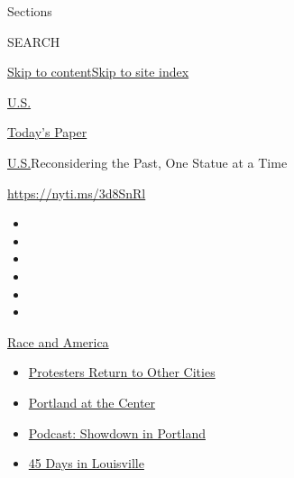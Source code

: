 Sections

SEARCH

\protect\hyperlink{site-content}{Skip to
content}\protect\hyperlink{site-index}{Skip to site index}

\href{https://www.nytimes3xbfgragh.onion/section/us}{U.S.}

\href{https://myaccount.nytimes3xbfgragh.onion/auth/login?response_type=cookie\&client_id=vi}{}

\href{https://www.nytimes3xbfgragh.onion/section/todayspaper}{Today's
Paper}

\href{/section/us}{U.S.}\textbar{}Reconsidering the Past, One Statue at
a Time

\url{https://nyti.ms/3d8SnRl}

\begin{itemize}
\item
\item
\item
\item
\item
\item
\end{itemize}

\href{https://www.nytimes3xbfgragh.onion/news-event/george-floyd-protests-minneapolis-new-york-los-angeles?action=click\&pgtype=Article\&state=default\&region=TOP_BANNER\&context=storylines_menu}{Race
and America}

\begin{itemize}
\tightlist
\item
  \href{https://www.nytimes3xbfgragh.onion/2020/07/26/us/protests-portland-seattle-trump.html?action=click\&pgtype=Article\&state=default\&region=TOP_BANNER\&context=storylines_menu}{Protesters
  Return to Other Cities}
\item
  \href{https://www.nytimes3xbfgragh.onion/2020/07/24/us/portland-oregon-protests-white-race.html?action=click\&pgtype=Article\&state=default\&region=TOP_BANNER\&context=storylines_menu}{Portland
  at the Center}
\item
  \href{https://www.nytimes3xbfgragh.onion/2020/07/23/podcasts/the-daily/portland-protests.html?action=click\&pgtype=Article\&state=default\&region=TOP_BANNER\&context=storylines_menu}{Podcast:
  Showdown in Portland}
\item
  \href{https://www.nytimes3xbfgragh.onion/interactive/2020/07/16/us/black-lives-matter-protests-louisville-breonna-taylor.html?action=click\&pgtype=Article\&state=default\&region=TOP_BANNER\&context=storylines_menu}{45
  Days in Louisville}
\end{itemize}

